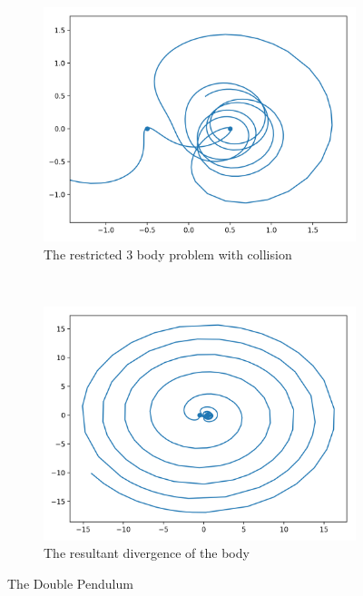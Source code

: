 \documentclass{article}
\begin{document}
\begin{figure}[h]
    \centering
    \begin{subfigure}[b]{0.4\textwidth}
        \includegraphics[width=\textwidth]{images/r3b_collision.png}
        \caption{The restricted 3 body problem with collision}
        \label{fig:r3b_collision}
    \end{subfigure}
    ~
    \begin{subfigure}[b]{0.4\textwidth}
        \includegraphics[width=\textwidth]{images/r3b_collision_whole.png}
        \caption{The resultant divergence of the body}
        \label{fig:r3b_collision_whole}
    \end{subfigure}
    \caption{The Double Pendulum}
    \label{fig:doub_pend}
\end{figure}
\end{document}
